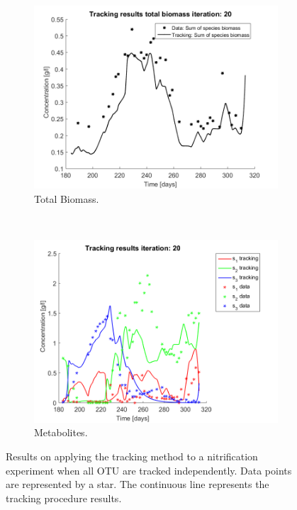 \documentclass[3p,times]{article}
\begin{document}
\begin{figure}[h]
	\centering
	\begin{subfigure}{0.45 \linewidth}
		\includegraphics[width= \textwidth]{Application/200407_iter_20_Biomass}
		\caption{Total Biomass.}
		\label{Total Biomass application all}
	\end{subfigure}
	~
	\begin{subfigure}{0.45 \linewidth}
		\includegraphics[width=\textwidth]{Application/200407_iter_20_metabolites}
		\caption{Metabolites.}
		\label{Metabolites application all}
	\end{subfigure}
	\caption{Results on applying the tracking method to a nitrification experiment when all OTU are tracked independently. Data points are represented by a star. The continuous line represents the tracking procedure results.}
	\label{all_OTU_results}
\end{figure}
\end{document}
